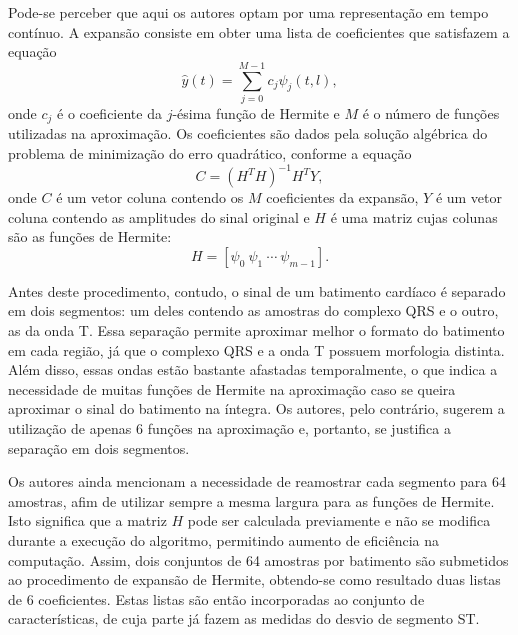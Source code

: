Pode-se perceber que aqui os autores optam por uma representação em tempo contínuo. A expansão consiste em obter uma lista de coeficientes que satisfazem a equação
\begin{equation}
   \hat{y}(t) = \sum_{j=0}^{M-1} c_j\psi_j(t,l),
\end{equation}
onde $c_j$ é o coeficiente da $j$-ésima função de Hermite e $M$ é o número de funções utilizadas na aproximação. Os coeficientes são dados pela solução algébrica do problema de minimização do erro quadrático, conforme a equação
\begin{equation}
    C = (H^TH)^{-1}H^TY,
\end{equation}
onde $C$ é um vetor coluna contendo os $M$ coeficientes da expansão, $Y$ é um vetor coluna contendo as amplitudes do sinal original e $H$ é uma matriz cujas colunas são as funções de Hermite:
\begin{equation}
    H = [\psi_0\ \psi_1\ \cdots\ \psi_{m-1}].
\end{equation}

Antes deste procedimento, contudo, o sinal de um batimento cardíaco é separado em dois segmentos: um deles contendo as amostras do complexo QRS e o outro, as da onda T. Essa separação permite aproximar melhor o formato do batimento em cada região, já que o complexo QRS e a onda T possuem morfologia distinta. Além disso, essas ondas estão bastante afastadas temporalmente, o que indica a necessidade de muitas funções de Hermite na aproximação caso se queira aproximar o sinal do batimento na íntegra. Os autores, pelo contrário, sugerem a utilização de apenas 6 funções na aproximação e, portanto, se justifica a separação em dois segmentos.

Os autores ainda mencionam a necessidade de reamostrar cada segmento para 64 amostras, afim de utilizar sempre a mesma largura para as funções de Hermite. Isto significa que a matriz $H$ pode ser calculada previamente e não se modifica durante a execução do algoritmo, permitindo aumento de eficiência na computação. Assim, dois conjuntos de 64 amostras por batimento são submetidos ao procedimento de expansão de Hermite, obtendo-se como resultado duas listas de 6 coeficientes. Estas listas são então incorporadas ao conjunto de características, de cuja parte já fazem as medidas do desvio de segmento ST.

